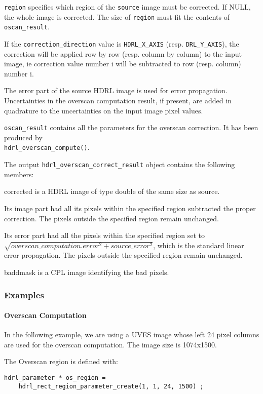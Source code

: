 \verb+region+ specifies which region of the \verb+source+ image must be 
corrected. If NULL, the whole image is corrected.
The size of \verb+region+ must fit the contents of \verb+oscan_result+.

If the \verb+correction_direction+ value is \verb+HDRL_X_AXIS+ (resp.
\verb+DRL_Y_AXIS+), the correction will be applied row by row (resp. column by
column) to the input image, ie correction value number i will be subtracted to
row (resp. column) number i.

The error part of the source HDRL image is used for error propagation.
Uncertainties in the overscan computation result, if present, are added in
quadrature to the uncertainties on the input image pixel values. 

\verb+oscan_result+ contains all the parameters for the overscan correction. 
It has been produced by \\
\verb+hdrl_overscan_compute()+.

The output \verb+hdrl_overscan_correct_result+ object contains the following 
members:

corrected is a HDRL image of type double of the same size as source.

Its image part had all its pixels within the specified region subtracted the 
proper correction. The pixels outside the specified region remain unchanged.

Its error part had all the pixels within the specified region set to 
$\sqrt{overscan\_computation.error^{2} + source\_error^{2}}$, which is the 
standard linear error propagation.
The pixels outside the specified region remain unchanged.

baddmask is a CPL image identifying the bad pixels.

\subsubsection{Examples}

\paragraph{Overscan Computation}

In the following example, we are using a UVES image whose left 24 pixel 
columns are used for the overscan computation. The image size is 1074x1500.


The Overscan region is defined with:
\begin{lstlisting}
hdrl_parameter * os_region = 
    hdrl_rect_region_parameter_create(1, 1, 24, 1500) ;
\end{lstlisting}

